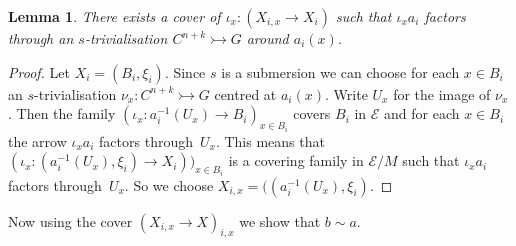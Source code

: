 \documentclass[pdftex]{sigma}
\numberwithin{equation}{section}
\newtheorem{Lemma}[Theorem]{Lemma}
\begin{document}
\begin{Lemma} There exists a cover of $\iota_x\colon (X_{i,x}\rightarrow X_i)$ such that $\iota_x a_i$ factors through an $s$-trivialisation $C^{n+k} \rightarrowtail G$ around $a_i(x)$.
\end{Lemma}
\begin{proof} Let $X_i = (B_i,\xi_i)$. Since $s$ is a submersion we can choose for each $x\in B_i$ an $s$-trivialisation $\nu_x\colon C^{n+k}\rightarrowtail G$ centred at $a_i(x)$. Write $U_x$ for the image of $\nu_x$. Then the family $(\iota_x\colon a_i^{-1}(U_x) \rightarrow B_i)_{x\in B_i}$ covers $B_i$ in $\mathcal{E}$ and for each $x\in B_i$ the arrow $\iota_x a_i$ factors through~$U_x$. This means that $(\iota_{x}\colon (a_i^{-1}(U_x),\xi_i) \rightarrow X_i))_{x\in B_i}$ is a covering family in $\mathcal{E}/M$ such that $\iota_x a_i$ factors through~$U_x$. So we choose $X_{i,x}=((a_i^{-1}(U_x),\xi_i)$.
\end{proof}

Now using the cover $(X_{i,x}\rightarrow X)_{i,x}$ we show that $b\sim a$.
\end{document}
